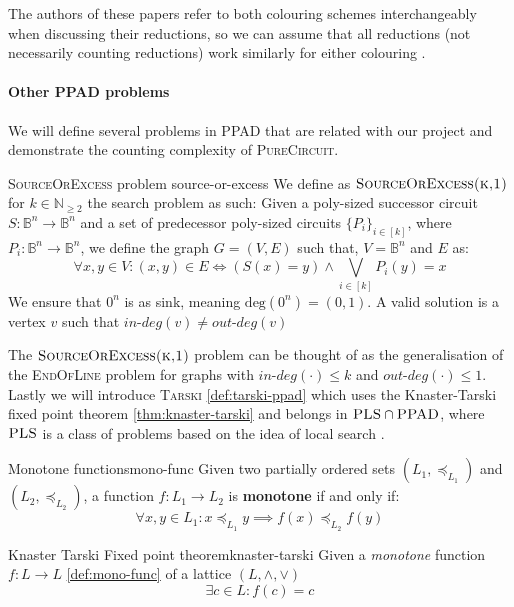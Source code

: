 The authors of these papers refer to both colouring schemes interchangeably when discussing their reductions,
so we can assume that all reductions (not necessarily counting reductions) work similarly for either colouring
\cite{chen_SettlingComplexityComputing_2009, deligkas_PureCircuitTightInapproximability_2024, daskalakis_ComplexityComputingNash_2006, chen_Complexity2DDiscrete_2009}.


\paragraph{Other PPAD problems} 

We will define several problems in \textsc{PPAD} that are related with our project
and demonstrate the counting complexity of \textsc{PureCircuit}.

\begin{definitionbox}{\textsc{SourceOrExcess} problem \cite{ikenmeyer_WhatWhatNot_2022}}{source-or-excess}
    We define as $\textsc{SourceOrExcess(k,1)}$ for $k \in \mathbb{N}_{\geq 2}$
    the search problem as such: Given a poly-sized successor circuit $S : \mathbb{B}^n \to \mathbb{B}^n$
    and a set of predecessor poly-sized circuits $\{P_i\}_{i \in [k]}$, where $P_i : \mathbb{B}^n \to \mathbb{B}^n$, we define
    the graph $G = (V,E)$ such that, $V = \mathbb{B}^n$ and $E$ as:
    $$
    \forall x, y \in V: (x,y) \in E \iff (S(x) = y) \wedge \bigvee_{i \in [k]} P_i(y) = x
    $$
    We ensure that $0^n$ is as sink, meaning $\text{deg}(0^n) = (0,1)$.
    A valid solution is a vertex $v$ such that $\textit{in-deg}(v) \neq \textit{out-deg}(v)$
\end{definitionbox}

The $\textsc{SourceOrExcess(k,1)}$ problem can be thought of as the generalisation of the \textsc{EndOfLine}
problem for graphs with $\textit{in-deg}(\cdot) \leq k$ and $\textit{out-deg}(\cdot) \leq 1$.
Lastly we will introduce \textsc{Tarski} \ref{def:tarski-ppad}
which uses the Knaster-Tarski fixed point theorem \ref{thm:knaster-tarski} and
belongs in $\textsc{PLS} \cap \textsc{PPAD}$,
where  $\textsc{PLS}$ is a class of problems based on the idea of local search \cite{johnson_HowEasyLocal_1988}.
%
%
\begin{definitionbox}{Monotone functions}{mono-func}
    Given two partially ordered sets $(L_1, \preceq_{L_1})$ and $(L_2, \preceq_{L_2})$, a function
    $f: L_1 \to L_2$ is \textbf{monotone} if and only if:
    $$
    \forall x,y \in L_1: x \preceq_{L_1} y \implies f(x) \preceq_{L_2} f(y)
    $$
\end{definitionbox}
%     
%
\begin{theorembox}{Knaster Tarski Fixed point theorem\cite{bronislaw_TheoremeFunctionsDensembles_1928, fearnley_FasterAlgorithmFinding_2022}}{knaster-tarski}
    Given a \textit{monotone} function $f: L \to L$ \ref{def:mono-func} of a lattice $(L, \wedge, \vee)$
    $$
    \exists c \in L: f(c) = c
    $$
\end{theorembox}

